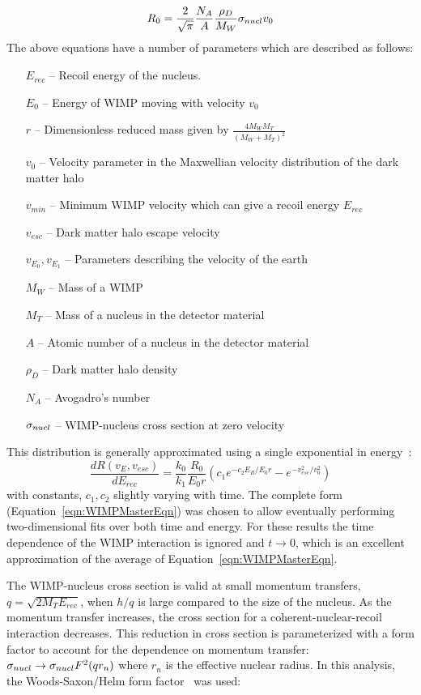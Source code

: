		\[
			R_{0} = \frac{2}{\sqrt{\pi}} \frac{N_{A}}{A} \frac{\rho_{D}}{M_{W}} \sigma_{nucl} v_{0}
		\]
The above equations have a number of parameters which are described as follows:

		\begin{itemize}
			\item[$E_{rec}$]  -- Recoil energy of the nucleus. 
			\item[$E_{0}$] -- Energy of WIMP moving with velocity $v_{0}$
			\item[$r$] 	-- Dimensionless reduced mass given by 
					$\frac{4 M_{W} M_{T}}{(M_{W} + M_{T})^{2}}$
			\item[$v_{0}$] -- Velocity parameter in the Maxwellian velocity distribution of 
						the dark matter halo
			\item[$v_{min}$] -- Minimum WIMP velocity which can give a recoil energy $E_{rec}$
			\item[$v_{esc}$] -- Dark matter halo escape velocity
			\item[$v_{E_{0}}, v_{E_{1}}$] -- Parameters describing the velocity of the earth
			\item[$M_{W}$] -- Mass of a WIMP
			\item[$M_{T}$] -- Mass of a nucleus in the detector material
			\item[$A$] -- Atomic number of a nucleus in the detector material
			\item[$\rho_{D}$] -- Dark matter halo density	
			\item[$N_{A}$] -- Avogadro's number
			\item[$\sigma_{nucl}$] -- WIMP-nucleus cross section at zero velocity
		\end{itemize}			
This distribution is generally approximated using a single exponential in energy~\cite{Lew96}:
		\begin{equation}
\frac{dR (v_{E}, v_{esc})}{dE_{rec}} = 
				\frac{k_{0}}{k_{1}} \frac{R_{0}}{E_{0} r} 
				\left(  
					c_{1} e^{-c_{2}E_{R}/E_{0}r} 
					- e^{-v_{esc}^{2}/v_{0}^{2}} 
				\right)
		\end{equation}
 with constants, $c_{1}, c_{2}$ slightly varying with time.  The complete form (Equation~\ref{eqn:WIMPMasterEqn}) was chosen to allow eventually performing two-dimensional fits over both time and energy.  For these results the time dependence of the WIMP interaction is ignored and $t\to0$, which is an excellent approximation of the average of Equation~\ref{eqn:WIMPMasterEqn}.  

The WIMP-nucleus cross section is valid at small momentum transfers, $q = \sqrt{2 M_{T} E_{rec}}$, when $h/q$ is large compared to the size of the nucleus.  As the momentum transfer increases, the cross section for a coherent-nuclear-recoil interaction decreases.  This reduction in cross section is parameterized with a form factor to account for the dependence on momentum transfer: $\sigma_{nucl} \to \sigma_{nucl} F^{2} (q r_{n})$ where $r_{n}$ is the effective nuclear radius.  In this analysis, the Woods-Saxon/Helm form factor~\cite{Helm56} was used:


